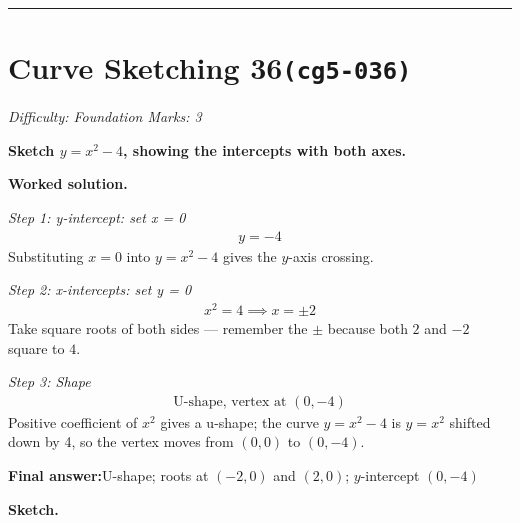 \documentclass[11pt]{article}
\newcommand{\question}[1]{\par\medskip\noindent\textbf{#1}\par}
\begin{document}
\medskip\hrule

\section*{Curve Sketching 36\quad\small\texttt{(cg5-036)}}
\textit{Difficulty: Foundation \quad\textbar\quad Marks: 3}

\question{Sketch \( y = x^2 - 4 \), showing the intercepts with both axes.}

\textbf{Worked solution.}

\textit{Step 1: y-intercept: set x = 0}
\[\begin{gathered}
y = -4
\end{gathered}\]
Substituting \( x = 0 \) into \( y = x^2 - 4 \) gives the \( y \)-axis crossing.

\textit{Step 2: x-intercepts: set y = 0}
\[\begin{gathered}
x^2 = 4 \implies x = \pm 2
\end{gathered}\]
Take square roots of both sides --- remember the \( \pm \) because both \( 2 \) and \( -2 \) square to \( 4 \).

\textit{Step 3: Shape}
\[\begin{gathered}
\text{U-shape, vertex at } (0, -4)
\end{gathered}\]
Positive coefficient of \( x^2 \) gives a u-shape; the curve \( y = x^2 - 4 \) is \( y = x^2 \) shifted down by 4, so the vertex moves from \( (0,0) \) to \( (0,-4) \).

\begin{answerbox}
\textbf{Final answer:}\quad U-shape; roots at \(\displaystyle (-2,0)\) and \(\displaystyle (2,0)\); \(\displaystyle y\)-intercept \(\displaystyle (0,-4)\)
\end{answerbox}
\textbf{Sketch.}
\end{document}
